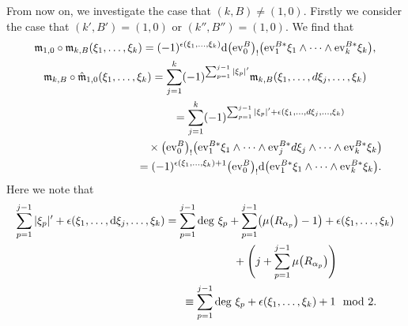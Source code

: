 \documentclass[pdftex]{sigma}
\numberwithin{equation}{section}
\theoremstyle{definition}
\begin{document}
From now on, we investigate the case that $(k,B) \neq (1,0)$.
Firstly we consider the case that $(k',B')=(1,0)$ or $(k'',B'') = (1,0)$.
We find that
\begin{gather}
{\mathfrak m}_{1,0} \circ {\mathfrak m}_{k,B} (\xi_1, \dots, \xi_k) = (-1)^{\epsilon(\xi_1, \dots, \xi_k)} {\rm d} \bigl({\rm ev}_0^B\bigr)_! \bigl({\rm ev}_1^{B*} \xi_1 \wedge \dots \wedge {\rm ev}_k^{B*}\xi_k\bigr), \label{rel1}\\
{\mathfrak m}_{k,B} \circ \hat{\mathfrak m}_{1,0} (\xi_1, \dots, \xi_k) = \sum_{j=1}^k (-1)^{\sum_{p=1}^{j-1} \vert \xi_p \vert'} {\mathfrak m}_{k,B} (\xi_1, \dots, d\xi_j, \dots, \xi_k)
\nonumber \\ \hphantom{{\mathfrak m}_{k,B} \circ \hat{\mathfrak m}_{1,0} (\xi_1, \dots, \xi_k)}{}
= \sum_{j=1}^k (-1)^{\sum_{p=1}^{j-1} \vert \xi_p \vert' + \epsilon(\xi_1, \dots, d\xi_j, \dots, \xi_k)} \nonumber \\ \hphantom{{\mathfrak m}_{k,B} \circ \hat{\mathfrak m}_{1,0} (\xi_1, \dots, \xi_k)=}{}
 \times \bigl({\rm ev}_0^B\bigr)_!\bigl({\rm ev}_1^{B*}\xi_1 \wedge \dots \wedge {\rm ev}_j^{B*} d\xi_j \wedge \dots
\wedge {\rm ev}_k^{B*}\xi_k\bigr) \nonumber \\ \hphantom{{\mathfrak m}_{k,B} \circ \hat{\mathfrak m}_{1,0} (\xi_1, \dots, \xi_k)}{}
=  (-1)^{\epsilon(\xi_1, \dots, \xi_k) +1} \bigl({\rm ev}_0^B\bigr)_! {\rm d}\bigl({\rm ev}_1^{B*}\xi_1 \wedge \dots \wedge {\rm ev}_k^{B*} \xi_k\bigr). \label{rel2}
\end{gather}
Here we note that
\begin{gather*}
\sum_{p=1}^{j-1} \vert \xi_p \vert' + \epsilon(\xi_1, \dots, {\rm d}\xi_j, \dots, \xi_k)  =  \sum_{p=1}^{j-1} {\rm deg~ } \xi_p + \sum_{p=1}^{j-1} \bigl( \mu\bigl(R_{\alpha_p}\bigr)-1 \bigr) +
\epsilon(\xi_1, \dots, \xi_k)  \\ \hphantom{\sum_{p=1}^{j-1} \vert \xi_p \vert' + \epsilon(\xi_1, \dots, d\xi_j, \dots, \xi_k)  =}{}
  + \Biggl( j + \sum_{p=1}^{j-1} \mu\bigl(R_{\alpha_p}\bigr) \Biggr)  \\ \hphantom{\sum_{p=1}^{j-1} \vert \xi_p \vert' + \epsilon(\xi_1, \dots, d\xi_j, \dots, \xi_k) }{}
 \equiv  \sum_{p=1}^{j-1} {\rm deg~ }\xi_p + \epsilon(\xi_1, \dots, \xi_k) +1 \mod 2.
\end{gather*}
\end{document}
